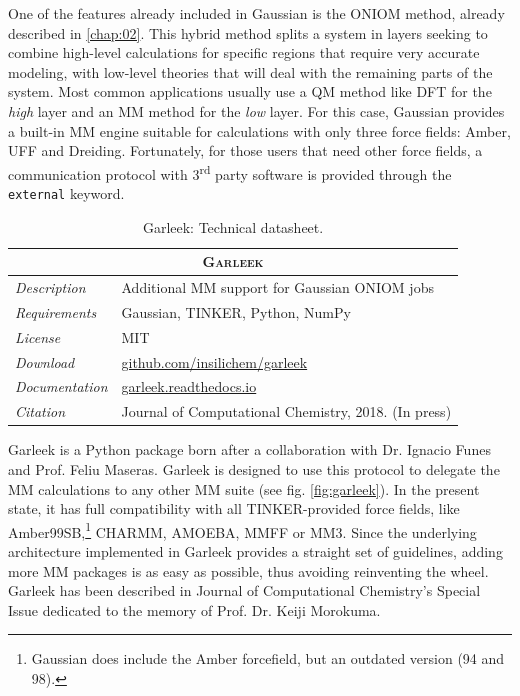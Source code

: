 One of the features already included in Gaussian is the ONIOM method,\cite{svensson1996oniom} already described in \autoref{chap:02}. This hybrid method splits a system in layers seeking to combine high-level calculations for specific regions that require very accurate modeling, with low-level theories that will deal with the remaining parts of the system. Most common applications usually use a QM method like DFT for the \textit{high} layer and an MM method for the \textit{low} layer. For this case, Gaussian provides a built-in MM engine suitable for calculations with only three force fields: Amber,\cite{cornell1995second} UFF\cite{Rappe1992} and Dreiding.\cite{Mayo1990} Fortunately, for those users that need other force fields, a communication protocol with 3\textsuperscript{rd} party software is provided through the \texttt{external} keyword.

\begin{table}[hbtp]
	\caption[Garleek: Technical datasheet]{Garleek: Technical datasheet.}
	\footnotesize
	\newcommand{\tableheading}[1]{\multicolumn{2}{c}{\textsc{#1}}}
	\begin{tabularx}{\textwidth}{RL}
		\toprule
		\tableheading{Garleek}\\
		\toprule
		\textit{Description} & Additional MM support for Gaussian ONIOM jobs \\
		\midrule
		\textit{Requirements} & Gaussian, TINKER, Python, NumPy \\
		\midrule
		\textit{License} & MIT \\
		\midrule
		\textit{Download} & \href{https://github.com/insilichem/garleek}{github.com/insilichem/garleek} \\
		\midrule
		\textit{Documentation} & \href{http://garleek.readthedocs.io}{garleek.readthedocs.io} \\
		\midrule
		\textit{Citation} & Journal of Computational Chemistry, 2018. (In press) \\
		\bottomrule

	\end{tabularx}
\end{table}

Garleek is a Python package born after a collaboration with Dr. Ignacio Funes and Prof. Feliu Maseras. Garleek is designed to use this protocol to delegate the MM calculations to any other MM suite (see fig. \ref{fig:garleek}). In the present state, it has full compatibility with all TINKER-provided force fields, like Amber99SB,\cite{amber99sb}\footnote{Gaussian does include the Amber forcefield, but an outdated version (94 and 98).} CHARMM,\cite{mackerell1998all} AMOEBA,\cite{amoeba} MMFF\cite{halgren1996merck} or MM3.\cite{allinger1989molecular} Since the underlying architecture implemented in Garleek provides a straight set of guidelines, adding more MM packages is as easy as possible, thus avoiding reinventing the wheel. Garleek has been described in Journal of Computational Chemistry's Special Issue\cite{garleek} dedicated to the memory of Prof. Dr. Keiji Morokuma.



